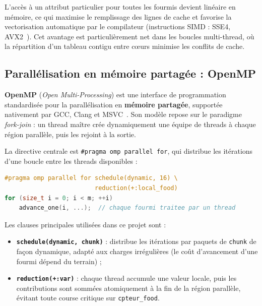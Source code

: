 L'accès à un attribut particulier pour toutes les fourmis devient linéaire en mémoire,
ce qui maximise le remplissage des lignes de cache et favorise la vectorisation
automatique par le compilateur (instructions SIMD : SSE4, AVX2~\cite{intel2012avx}).
Cet avantage est particulièrement net dans les boucles multi-thread, où la répartition
d'un tableau contigu entre cœurs minimise les conflits de cache.

\subsection{Parallélisation en mémoire partagée : OpenMP}

\textbf{OpenMP} (\textit{Open Multi-Processing}) est une interface de programmation
standardisée pour la parallélisation en \textbf{mémoire partagée}, supportée
nativement par GCC, Clang et MSVC~\cite{openmp5}. Son modèle repose sur le
paradigme \textit{fork-join} : un thread maître crée dynamiquement une équipe de
threads à chaque région parallèle, puis les rejoint à la sortie.

La directive centrale est \texttt{\#pragma omp parallel for}, qui distribue
les itérations d'une boucle entre les threads disponibles :

\begin{lstlisting}[language=C++, caption={Parallélisation d'une boucle avec OpenMP}]
#pragma omp parallel for schedule(dynamic, 16) \
                         reduction(+:local_food)
for (size_t i = 0; i < m; ++i)
    advance_one(i, ...);  // chaque fourmi traitee par un thread
\end{lstlisting}

Les clauses principales utilisées dans ce projet sont :
\begin{itemize}
    \item \textbf{\texttt{schedule(dynamic, chunk)}} : distribue les itérations par
          paquets de \texttt{chunk} de façon dynamique, adapté aux charges irrégulières
          (le coût d'avancement d'une fourmi dépend du terrain) ;
    \item \textbf{\texttt{reduction(+:var)}} : chaque thread accumule une valeur locale,
          puis les contributions sont sommées atomiquement à la fin de la région parallèle,
          évitant toute course critique sur \texttt{cpteur\_food}.
\end{itemize}

